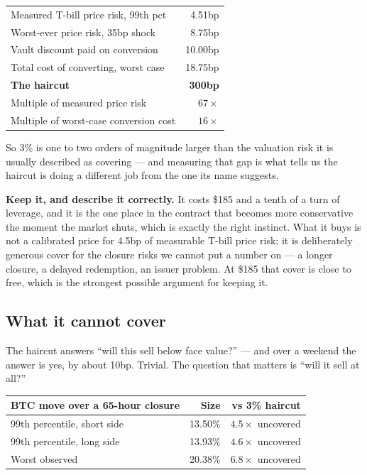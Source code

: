 \documentclass[11pt,a4paper]{article}
\begin{document}
\begin{center}
\small
\begin{tabular}{@{}lr@{}}
\toprule
Measured T-bill price risk, 99th pct & 4.51bp \\
Worst-ever price risk, 35bp shock & 8.75bp \\
Vault discount paid on conversion & 10.00bp \\
\midrule
Total cost of converting, worst case & 18.75bp \\
\textbf{The haircut} & \textbf{300bp} \\
\midrule
Multiple of measured price risk & $67\times$ \\
Multiple of worst-case conversion cost & $16\times$ \\
\bottomrule
\end{tabular}
\end{center}

So 3\% is one to two orders of magnitude larger than the valuation risk it is usually
described as covering — and measuring that gap is what tells us the haircut is doing a
different job from the one its name suggests.

\textbf{Keep it, and describe it correctly.} It costs \$185 and a tenth of a turn of
leverage, and it is the one place in the contract that becomes more conservative the
moment the market shuts, which is exactly the right instinct. What it buys is not a
calibrated price for 4.5bp of measurable T-bill price risk; it is deliberately generous
cover for the closure risks we cannot put a number on — a longer closure, a delayed
redemption, an issuer problem. At \$185 that cover is close to free, which is the strongest
possible argument for keeping it.

\subsection{What it cannot cover}

The haircut answers ``will this sell below face value?'' — and over a weekend the answer
is yes, by about 10bp. Trivial. The question that matters is ``will it sell at all?''

\begin{center}
\small
\begin{tabular}{@{}lrr@{}}
\toprule
\textbf{BTC move over a 65-hour closure} & \textbf{Size} & \textbf{vs 3\% haircut} \\
\midrule
99th percentile, short side & 13.50\% & $4.5\times$ uncovered \\
99th percentile, long side  & 13.93\% & $4.6\times$ uncovered \\
Worst observed              & 20.38\% & $6.8\times$ uncovered \\
\bottomrule
\end{tabular}
\end{center}
\end{document}
